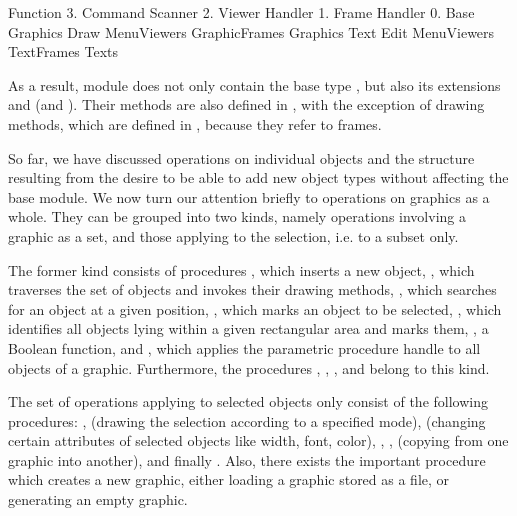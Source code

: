 Function
3. Command Scanner 2. Viewer Handler
1. Frame Handler
0. Base
Graphics
Draw MenuViewers GraphicFrames Graphics
Text
Edit MenuViewers TextFrames Texts

As a result, module  does not only contain the base type , but also its extensions  and  (and ). Their methods are also defined in , with the exception of drawing methods, which are defined in , because they refer to frames.

So far, we have discussed operations on individual objects and the structure resulting from the desire to be able to add new object types without affecting the base module. We now turn our attention briefly to operations on graphics as a whole. They can be grouped into two kinds, namely operations involving a graphic as a set, and those applying to the selection, i.e. to a subset only.

The former kind consists of procedures , which inserts a new object, , which traverses the set of objects and invokes their drawing methods, , which searches for an object at a given position, , which marks an object to be selected, , which identifies all objects lying within a given rectangular area and marks them, , a Boolean function, and , which applies the parametric procedure handle to all objects of a graphic. Furthermore, the procedures , , , and  belong to this kind.

The set of operations applying to selected objects only consist of the following procedures: ,  (drawing the selection according to a specified mode),  (changing certain attributes of selected objects like width, font, color), , ,  (copying from one graphic into another), and finally . Also, there exists the important procedure  which creates a new graphic, either loading a graphic stored as a file, or generating an empty graphic.

